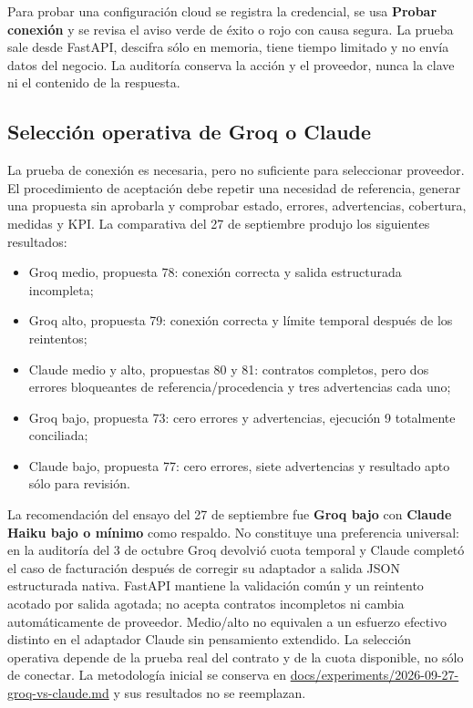 \documentclass[11pt,letterpaper]{article}
\begin{document}
Para probar una configuración cloud se registra la credencial, se usa \textbf{Probar conexión} y se revisa el aviso verde de éxito o rojo con causa segura. La prueba sale desde FastAPI, descifra sólo en memoria, tiene tiempo limitado y no envía datos del negocio. La auditoría conserva la acción y el proveedor, nunca la clave ni el contenido de la respuesta.

\subsection{Selección operativa de Groq o Claude}

La prueba de conexión es necesaria, pero no suficiente para seleccionar proveedor. El procedimiento de aceptación debe repetir una necesidad de referencia, generar una propuesta sin aprobarla y comprobar estado, errores, advertencias, cobertura, medidas y KPI. La comparativa del 27 de septiembre produjo los siguientes resultados:

\begin{itemize}
  \item Groq medio, propuesta 78: conexión correcta y salida estructurada incompleta;
  \item Groq alto, propuesta 79: conexión correcta y límite temporal después de los reintentos;
  \item Claude medio y alto, propuestas 80 y 81: contratos completos, pero dos errores bloqueantes de referencia/procedencia y tres advertencias cada uno;
  \item Groq bajo, propuesta 73: cero errores y advertencias, ejecución 9 totalmente conciliada;
  \item Claude bajo, propuesta 77: cero errores, siete advertencias y resultado apto sólo para revisión.
\end{itemize}

La recomendación del ensayo del 27 de septiembre fue \textbf{Groq bajo} con
\textbf{Claude Haiku bajo o mínimo} como respaldo. No constituye una preferencia universal:
en la auditoría del 3 de octubre Groq devolvió cuota temporal y Claude completó el caso
de facturación después de corregir su adaptador a salida JSON estructurada nativa.
FastAPI mantiene la validación común y un reintento acotado por salida agotada; no acepta
contratos incompletos ni cambia automáticamente de proveedor. Medio/alto no equivalen a
un esfuerzo efectivo distinto en el adaptador Claude sin pensamiento extendido. La
selección operativa depende de la prueba real del contrato y de la cuota disponible,
no sólo de conectar. La metodología inicial se conserva en
\url{docs/experiments/2026-09-27-groq-vs-claude.md} y sus resultados no se reemplazan.
\end{document}
